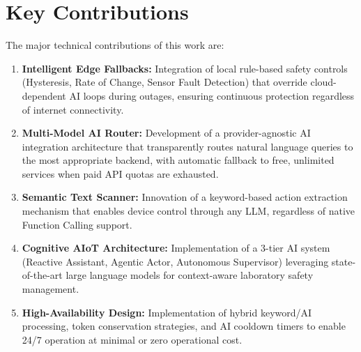 \documentclass[12pt,a4paper]{report}
\begin{document}
\section{Key Contributions}
The major technical contributions of this work are:
\begin{enumerate}[leftmargin=2cm]
    \item \textbf{Intelligent Edge Fallbacks:} Integration of local rule-based safety controls (Hysteresis, Rate of Change, Sensor Fault Detection) that override cloud-dependent AI loops during outages, ensuring continuous protection regardless of internet connectivity.
    \item \textbf{Multi-Model AI Router:} Development of a provider-agnostic AI integration architecture that transparently routes natural language queries to the most appropriate backend, with automatic fallback to free, unlimited services when paid API quotas are exhausted.
    \item \textbf{Semantic Text Scanner:} Innovation of a keyword-based action extraction mechanism that enables device control through any LLM, regardless of native Function Calling support.
    \item \textbf{Cognitive AIoT Architecture:} Implementation of a 3-tier AI system (Reactive Assistant, Agentic Actor, Autonomous Supervisor) leveraging state-of-the-art large language models for context-aware laboratory safety management.
    \item \textbf{High-Availability Design:} Implementation of hybrid keyword/AI processing, token conservation strategies, and AI cooldown timers to enable 24/7 operation at minimal or zero operational cost.
\end{enumerate}
\end{document}
